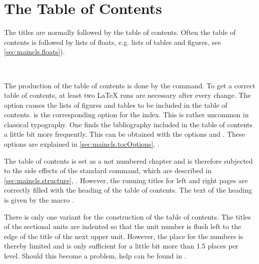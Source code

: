 \section{The Table of Contents}
\label{sec:maincls.toc}

The titles are normally followed by the table of contents.
Often the table of contents is followed by lists of floats, e.g. lists
of tables and figures, see \autoref{sec:maincls.floats}).

\begin{Declaration}
  \\
\end{Declaration}%
%
%
 The production of the table of contents is done by the
 command.
To get a correct table of contents, at least two \LaTeX{} runs are
necessary after every change.  The option  causes
the lists of figures and tables to be included in the table of
contents.  is the corresponding option for the index.
This is rather uncommon in classical typography. One finds the
bibliography included in the table of contents a little bit more
frequently. This can be obtained with the options 
and . These options are explained in
\autoref{sec:maincls.tocOptions},
.

\begin{Explain}
  The table of contents is set as a not numbered chapter and is therefore
  subjected to the side effects of the standard  command,
  which are described in \autoref{sec:maincls.structure},
  .  However, the running
  titles for left and right pages are correctly filled
  with the heading of the table of contents. The text of the heading is given
  by the macro .
\end{Explain}%
%
%


There is only one variant for the construction of the table of
contents. The titles of the sectional units are indented so that the
unit number is flush left to the edge of the title of the next upper
unit.  However, the place for the numbers is thereby limited and is
only sufficient for a little bit more than 1.5 places per level.
Should this become a problem, help can be found in \cite{DANTE:FAQ}.

